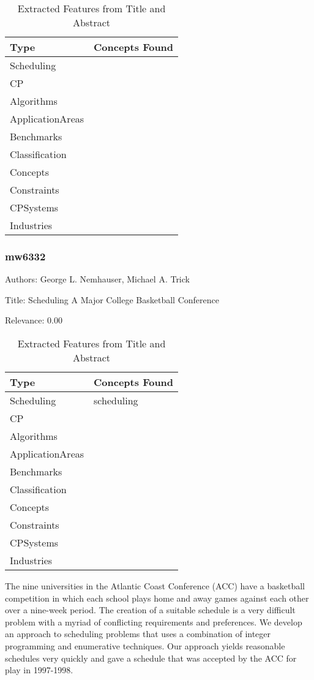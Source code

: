 {\scriptsize
\begin{longtable}{p{2cm}p{20cm}}
\caption{Extracted Features from Title and Abstract}\\ \toprule
Type & Concepts Found\\ \midrule
\endhead
\bottomrule
\endfoot
Scheduling & \\ 
CP & \\ 
Algorithms & \\ 
ApplicationAreas & \\ 
Benchmarks & \\ 
Classification & \\ 
Concepts & \\ 
Constraints & \\ 
CPSystems & \\ 
Industries & \\ 
\end{longtable}
}



\subsubsection{mw6332}
\label{mw:mw6332}

Authors: George L. Nemhauser, Michael A. Trick

Title: Scheduling A Major College Basketball Conference

Relevance:  0.00

{\scriptsize
\begin{longtable}{p{2cm}p{20cm}}
\caption{Extracted Features from Title and Abstract}\\ \toprule
Type & Concepts Found\\ \midrule
\endhead
\bottomrule
\endfoot
Scheduling & scheduling\\ 
CP & \\ 
Algorithms & \\ 
ApplicationAreas & \\ 
Benchmarks & \\ 
Classification & \\ 
Concepts & \\ 
Constraints & \\ 
CPSystems & \\ 
Industries & \\ 
\end{longtable}
}

  The nine universities in the Atlantic Coast Conference (ACC) have a basketball competition in which each school plays home and away games against each other over a nine-week period. The creation of a suitable schedule is a very difficult problem with a myriad of conflicting requirements and preferences. We develop an approach to scheduling problems that uses a combination of integer programming and enumerative techniques. Our approach yields reasonable schedules very quickly and gave a schedule that was accepted by the ACC for play in 1997-1998.  

